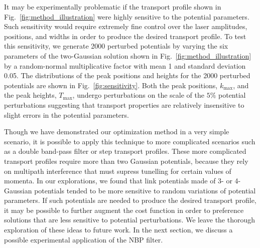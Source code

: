 \documentclass[reprint, twocolumn,amsmath,amssymb,showpacs,pra,superscriptaddress,aps]{revtex4-1}
\begin{document}
It may be experimentally problematic if the transport profile shown in Fig.~\ref{fig:method_illustration} were highly sensitive to the potential parameters. Such sensitivity would require extremely fine control over the laser amplitudes, positions, and widths in order to produce the desired transport profile. To test this sensitivity, we generate 2000 perturbed potentials by varying the six parameters of the two-Gaussian solution shown in Fig.~\ref{fig:method_illustration} by a random-normal multiplicative factor with mean 1 and standard deviation 0.05. The distributions of the peak positions and heights for the 2000 perturbed potentials are shown in Fig.~\ref{fig:sensitivity}. Both the peak positions, $k_{\mathrm{max}}$, and the peak heights, $T_{\mathrm{max}}$, undergo perturbations on the scale of the $5\%$  potential perturbations suggesting that transport properties are relatively insensitive to slight errors in the potential parameters. 

Though we have demonstrated our optimization method in a very simple scenario, it is possible to apply this technique to more complicated scenarios such as a double band-pass filter or step transport profiles. These more complicated transport profiles require more than two Gaussian potentials,
because they rely on multipath interference that must supress tunelling for certain values of momenta. In our explorations, we found that link potentials made of 3- or 4-Gaussian potentials tended to be more sensitive to random variations of potential parameters. If such potentials are needed to produce the desired transport profile, it may be possible to further augment the cost function in order to preference solutions that are less sensitive to potential perturbations. We leave the thorough exploration of these ideas to future work. In the next section, we discuss a possible experimental application of the NBP filter.
\end{document}
